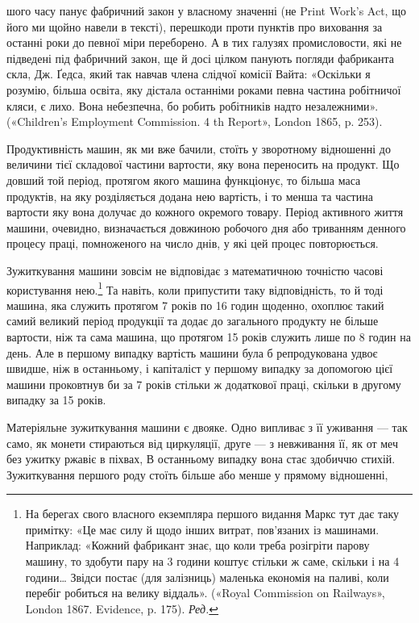 шого часу панує фабричний закон у власному значенні (не Print Work's
Act, що його ми щойно навели в тексті), перешкоди проти пунктів про
виховання за останні роки до певної міри переборено. А в тих галузях
промисловости, які не підведені під фабричний закон, ще й досі цілком
панують погляди фабриканта скла, Дж. Ґедса, який так навчав члена слідчої
комісії Вайта: «Оскільки я розумію, більша освіта, яку дістала останніми
роками певна частина робітничої кляси, є лихо. Вона небезпечна,
бо робить робітників надто незалежними». («Children’s Employment Commission.
4 th Report», London 1865, p. 253).

Продуктивність машин, як ми вже бачили, стоїть у зворотному
відношенні до величини тієї складової частини вартости, яку вона
переносить на продукт. Що довший той період, протягом якого
машина функціонує, то більша маса продуктів, на яку розділяється
додана нею вартість, і то менша та частина вартости
яку вона долучає до кожного окремого товару. Період активного
життя машини, очевидно, визначається довжиною робочого дня
або триванням денного процесу праці, помноженого на число
днів, у які цей процес повторюється.

Зужиткування машини зовсім не відповідає з математичною
точністю часові користування нею.\footnote*{
На берегах свого власного екземпляра першого видання Маркс
тут дає таку примітку: «Це має силу й щодо інших витрат, пов’язаних із
машинами. Наприклад: «Кожний фабрикант знає, що коли треба розігріти
парову машину, то здобути пару на 3 години коштує стільки ж саме,
скільки і на 4 години\dots{} Звідси постає (для залізниць) маленька економія
на паливі, коли перебіг робиться на велику віддаль». («Royal Commission
on Railways», London 1867. Evidence, p. 175). \emph{Ред.}
} Та навіть, коли припустити
таку відповідність, то й тоді машина, яка служить протягом
7 років по 16 годин щоденно, охоплює такий самий великий
період продукції та додає до загального продукту не більше
вартости, ніж та сама машина, що протягом 15 років служить
лише по 8 годин на день. Але в першому випадку вартість машини
була б репродукована удвоє швидше, ніж в останньому, і капіталіст
у першому випадку за допомогою цієї машини проковтнув би
за 7  років стільки ж додаткової праці, скільки в другому випадку
за 15 років.

Матеріяльне зужиткування машини є двояке. Одно випливає
з її уживання — так само, як монети стираються від циркуляції,
друге — з невживання її, як от меч без ужитку ржавіє в піхвах,
В останньому випадку вона стає здобиччю стихій. Зужиткування
першого роду стоїть більше або менше у прямому відношенні,

